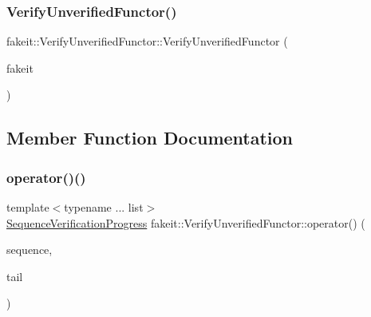 \subsubsection{\texorpdfstring{VerifyUnverifiedFunctor()}{VerifyUnverifiedFunctor()}\hspace{0.1cm}{\footnotesize\ttfamily [9/9]}}
{\footnotesize\ttfamily fakeit\+::\+Verify\+Unverified\+Functor\+::\+Verify\+Unverified\+Functor (\begin{DoxyParamCaption}\item[{\mbox{\hyperlink{structfakeit_1_1FakeitContext}{Fakeit\+Context}} \&}]{fakeit }\end{DoxyParamCaption})\hspace{0.3cm}{\ttfamily [inline]}}



\subsection{Member Function Documentation}
\mbox{\label{classfakeit_1_1VerifyUnverifiedFunctor_ac32fd9aaa7de99c3b6b89c39b642ecad}} 
\subsubsection{\texorpdfstring{operator()()}{operator()()}\hspace{0.1cm}{\footnotesize\ttfamily [1/9]}}
{\footnotesize\ttfamily template$<$typename ... list$>$ \\
\mbox{\hyperlink{classfakeit_1_1SequenceVerificationProgress}{Sequence\+Verification\+Progress}} fakeit\+::\+Verify\+Unverified\+Functor\+::operator() (\begin{DoxyParamCaption}\item[{const \mbox{\hyperlink{classfakeit_1_1Sequence}{Sequence}} \&}]{sequence,  }\item[{const list \&...}]{tail }\end{DoxyParamCaption})\hspace{0.3cm}{\ttfamily [inline]}}

\mbox{\label{classfakeit_1_1VerifyUnverifiedFunctor_ac32fd9aaa7de99c3b6b89c39b642ecad}} 
